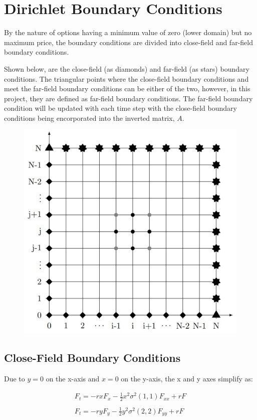 \documentclass[12pt,letterpaper]{article}
\begin{document}
\section*{Dirichlet Boundary Conditions}
By the nature of options having a minimum value of zero (lower domain) but no maximum price, the boundary conditions are divided into close-field and far-field boundary conditions.


Shown below, are the close-field (as diamonds) and far-field (as stars) boundary conditions. The triangular points where the close-field boundary conditions and meet the far-field boundary conditions can be either of the two, however, in this project, they are defined as far-field boundary conditions.
The far-field boundary condition will be updated with each time step with the close-field boundary conditions being encorporated into the inverted matrix, $A$.
\\

\begin{figure}[!h]
    \centering
    \includegraphics[width=.8\linewidth]{boundary-graph.jpg}\label{fig:Boundary Conditions Graph}
\end{figure}

\newpage
\subsection*{Close-Field Boundary Conditions}

Due to $y=0$ on the x-axis and $x=0$ on the y-axis, the x and y axes simplify as:

\begin{equation*}
\begin{matrix}
    F_{t} = -rxF_{x}-\frac{1}{2}x^{2}\sigma^{2}(1,1)F_{xx}+rF \\
    \\
    F_{t} = -ryF_{y}-\frac{1}{2}y^{2}\sigma^{2}(2,2)F_{yy}+rF
\end{matrix}
\end{equation*}
\end{document}
